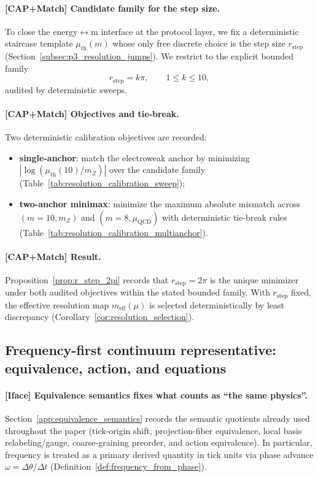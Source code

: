 \paragraph{[CAP+Match] Candidate family for the step size.}
To close the energy$\leftrightarrow$m interface at the protocol layer, we fix a deterministic staircase template $\mu_{\mathrm{th}}(m)$ whose only free discrete choice is the step size $r_{\mathrm{step}}$ (Section~\ref{subsec:p3_resolution_jumps}).
We restrict to the explicit bounded family
\[
r_{\mathrm{step}}=k\pi,\qquad 1\le k\le 10,
\]
audited by deterministic sweeps.

\paragraph{[CAP+Match] Objectives and tie-break.}
Two deterministic calibration objectives are recorded:
\begin{itemize}
\item \textbf{single-anchor}: match the electroweak anchor by minimizing $|\log(\mu_{\mathrm{th}}(10)/m_Z)|$ over the candidate family (Table~\ref{tab:resolution_calibration_sweep});
\item \textbf{two-anchor minimax}: minimize the maximum absolute mismatch across $(m=10,m_Z)$ and $(m=8,\mu_{\mathrm{QCD}})$ with deterministic tie-break rules (Table~\ref{tab:resolution_calibration_multianchor}).
\end{itemize}

\paragraph{[CAP+Match] Result.}
Proposition~\ref{prop:r_step_2pi} records that $r_{\mathrm{step}}=2\pi$ is the unique minimizer under both audited objectives within the stated bounded family.
With $r_{\mathrm{step}}$ fixed, the effective resolution map $m_{\mathrm{eff}}(\mu)$ is selected deterministically by least discrepancy (Corollary~\ref{cor:resolution_selection}).

\subsection{Frequency-first continuum representative: equivalence, action, and equations}
\label{subsec:tick_cap_continuum_representative}

\paragraph{[Iface] Equivalence semantics fixes what counts as ``the same physics''.}
Section~\ref{app:equivalence_semantics} records the semantic quotients already used throughout the paper (tick-origin shift, projection-fiber equivalence, local basis relabeling/gauge, coarse-graining preorder, and action equivalence).
In particular, frequency is treated as a primary derived quantity in tick units via phase advance $\omega=\Delta\theta/\Delta t$ (Definition~\ref{def:frequency_from_phase}).


